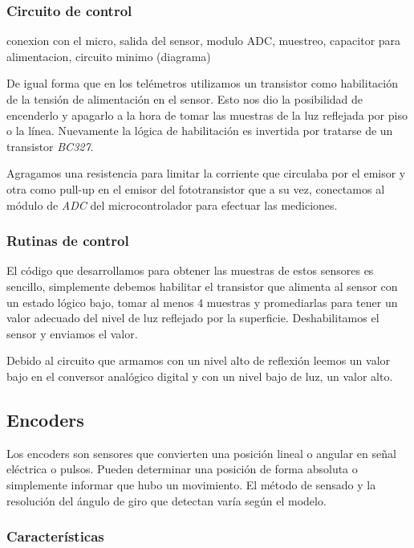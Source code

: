 \subsubsection{Circuito de control}
\label{h_sensado_piso_circuito}

conexion con el micro, salida del sensor, modulo ADC, muestreo, capacitor para alimentacion, circuito minimo (diagrama)

De igual forma que en los tel\'emetros utilizamos un transistor como habilitaci\'on de la tensi\'on de alimentaci\'on en el sensor.
Esto nos dio la posibilidad de encenderlo y apagarlo a la hora de tomar las muestras de la luz reflejada por piso o la l\'inea.
Nuevamente la l\'ogica de habilitaci\'on es invertida por tratarse de un transistor \emph{BC327}.

Agragamos una resistencia para limitar la corriente que circulaba por el emisor y otra como pull-up en el emisor del fototransistor
que a su vez, conectamos al m\'odulo de \emph{ADC} del microcontrolador para efectuar las mediciones.

\subsubsection{Rutinas de control}
\label{h_sensado_piso_rutinas}

El c\'odigo que desarrollamos para obtener las muestras de estos sensores es sencillo, simplemente debemos habilitar el
transistor que alimenta al sensor con un estado l\'ogico bajo, tomar al menos $4$ muestras y promediarlas para tener un
valor adecuado del nivel de luz reflejado por la superficie.
Deshabilitamos el sensor y enviamos el valor.

Debido al circuito que armamos con un nivel alto de reflexi\'on leemos un valor bajo en el conversor anal\'ogico digital y
con un nivel bajo de luz, un valor alto.

\subsection{Encoders}
\label{h_sensado_encoder}

Los encoders son sensores que convierten una posici\'on lineal o angular en se\~nal el\'ectrica o pulsos.
Pueden determinar una posici\'on de forma absoluta o simplemente informar que hubo un movimiento.
El m\'etodo de sensado y la resoluci\'on del \'angulo de giro que detectan var\'ia seg\'un el modelo.

\subsubsection{Caracter\'isticas}
\label{h_sensado_encoder_caracteristicas}

